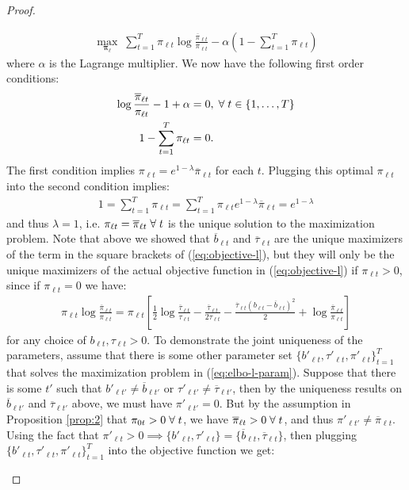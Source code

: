 \begin{proof}
\begin{enumerate}[label=\roman*.]
\begin{align*}
    \max_{\boldsymbol{\pi}_\ell} \; \sum_{t=1}^T \pi_{\ell t} \log \frac{\overline{\pi}_{\ell t}}{\pi_{\ell t}} - \alpha \left(1 - \sum_{t=1}^T \pi_{\ell t}\right) 
\end{align*}
where $\alpha$ is the Lagrange multiplier. We now have the following first order conditions:
\begin{align*}
    \log \frac{\overline{\pi}_{\ell t}}{\pi_{\ell t}}  -1 + \alpha &=0, \;\forall\; t \in \{1, \ldots, T\} \\
    1 - \sum_{t=1}^T \pi_{\ell t} &= 0.
\end{align*}
The first condition implies $\pi_{\ell t} = e^{1- \lambda}\overline{\pi}_{\ell t}$ for each $t$. Plugging this optimal $\pi_{\ell t}$ into the second condition implies:
\begin{align*}
   1 = \sum_{t=1}^T \pi_{\ell t} = \sum_{t=1}^T \pi_{\ell t} e^{1- \lambda}\overline{\pi}_{\ell t} =  e^{1- \lambda}
\end{align*}
and thus $\lambda=1$, i.e. $\pi_{\ell t} = \overline{\pi}_{\ell t} \;\forall\; t$ is the unique solution to the maximization problem. Note that above we showed that $\overline{b}_{\ell t}$ and $\overline{\tau}_{\ell t}$ are the unique maximizers of the term in the square brackets of (\ref{eq:objective-l}), but they will only be the unique maximizers of the actual objective function in (\ref{eq:objective-l}) if $\pi_{\ell t} > 0$, since if $\pi_{\ell t}=0$ we have:
\begin{align*}
     \pi_{\ell t}\log \frac{\overline{\pi}_{\ell t}}{\pi_{\ell t}} = \pi_{\ell t}\left[ \frac{1}{2}\log \frac{\overline{\tau}_{\ell t}}{\tau_{\ell t}} - \frac{\overline{\tau}_{\ell t}}{2\tau_{\ell t}} - \frac{\overline{\tau}_{\ell t}(b_{\ell t}  - \overline{b}_{\ell t})^2}{2} + \log \frac{\overline{\pi}_{\ell t} }{\pi_{\ell t}}\right]
\end{align*}
for any choice of $b_{\ell t}, \tau_{\ell t} >0$. To demonstrate the joint uniqueness of the parameters, assume that there is some other parameter set $\{b'_{\ell t}, \tau'_{\ell t}, \pi'_{\ell t}\}_{t=1}^T$ that solves the maximization problem in (\ref{eq:elbo-l-param}). Suppose that there is some $t'$ such that $b'_{\ell t'} \neq \overline{b}_{\ell t'}$ or $\tau'_{\ell t'}\neq \overline{\tau}_{\ell t'}$, then by the uniqueness results on $\overline{b}_{\ell t'}$ and $\overline{\tau}_{\ell t'}$ above, we must have $\pi'_{\ell t'} = 0$. But by the assumption in Proposition \ref{prop:2} that $\pi_{0t} >0 \;\forall\; t$, we have $\overline{\pi}_{\ell t} > 0 \;\forall\; t$, and thus $\pi'_{\ell t'} \neq \overline{\pi}_{\ell t}$. Using the fact that $\pi'_{\ell t} > 0 \implies \{b'_{\ell t}, \tau'_{\ell t}\} = \{\overline{b}_{\ell t}, \overline{\tau}_{\ell t}\}$, then plugging $\{b'_{\ell t}, \tau'_{\ell t}, \pi'_{\ell t}\}_{t=1}^T$ into the objective function we get:

\end{enumerate}
\end{proof}
